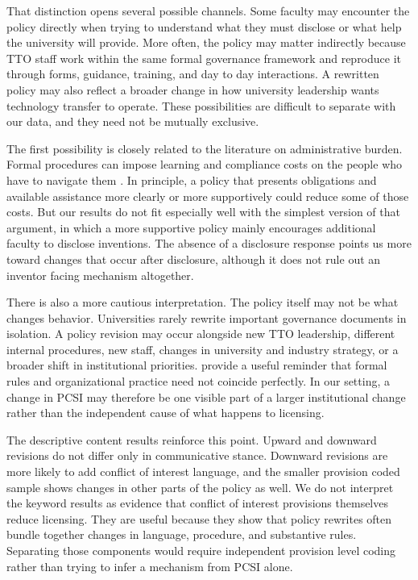 That distinction opens several possible channels. Some faculty may encounter the policy directly when trying to understand what they must disclose or what help the university will provide. More often, the policy may matter indirectly because TTO staff work within the same formal governance framework and reproduce it through forms, guidance, training, and day to day interactions. A rewritten policy may also reflect a broader change in how university leadership wants technology transfer to operate. These possibilities are difficult to separate with our data, and they need not be mutually exclusive.

The first possibility is closely related to the literature on administrative burden. Formal procedures can impose learning and compliance costs on the people who have to navigate them \citep{MoynihanHerdHarvey2015,HerdMoynihan2018}. In principle, a policy that presents obligations and available assistance more clearly or more supportively could reduce some of those costs. But our results do not fit especially well with the simplest version of that argument, in which a more supportive policy mainly encourages additional faculty to disclose inventions. The absence of a disclosure response points us more toward changes that occur after disclosure, although it does not rule out an inventor facing mechanism altogether.

There is also a more cautious interpretation. The policy itself may not be what changes behavior. Universities rarely rewrite important governance documents in isolation. A policy revision may occur alongside new TTO leadership, different internal procedures, new staff, changes in university and industry strategy, or a broader shift in institutional priorities. \citet{MeyerRowan1977} provide a useful reminder that formal rules and organizational practice need not coincide perfectly. In our setting, a change in PCSI may therefore be one visible part of a larger institutional change rather than the independent cause of what happens to licensing.

The descriptive content results reinforce this point. Upward and downward revisions do not differ only in communicative stance. Downward revisions are more likely to add conflict of interest language, and the smaller provision coded sample shows changes in other parts of the policy as well. We do not interpret the keyword results as evidence that conflict of interest provisions themselves reduce licensing. They are useful because they show that policy rewrites often bundle together changes in language, procedure, and substantive rules. Separating those components would require independent provision level coding rather than trying to infer a mechanism from PCSI alone.


